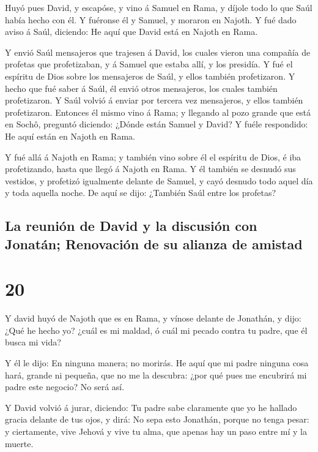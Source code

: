  Huyó pues David, y escapóse, y vino á Samuel en Rama, y
díjole todo lo que Saúl había hecho con él. Y fuéronse él y Samuel, y
moraron en Najoth.  Y fué dado aviso á Saúl, diciendo: He
aquí que David está en Najoth en Rama.

 Y envió Saúl mensajeros que trajesen á David, los cuales
vieron una compañía de profetas que profetizaban, y á Samuel que estaba
allí, y los presidía. Y fué el espíritu de Dios sobre los mensajeros de
Saúl, y ellos también profetizaron.  Y hecho que fué saber
á Saúl, él envió otros mensajeros, los cuales también profetizaron. Y
Saúl volvió á enviar por tercera vez mensajeros, y ellos también
profetizaron.  Entonces él mismo vino á Rama; y llegando al
pozo grande que está en Sochô, preguntó diciendo: ¿Dónde están Samuel y
David? Y fuéle respondido: He aquí están en Najoth en Rama.

 Y fué allá á Najoth en Rama; y también vino sobre él el
espíritu de Dios, é iba profetizando, hasta que llegó á Najoth en Rama.
 Y él también se desnudó sus vestidos, y profetizó
igualmente delante de Samuel, y cayó desnudo todo aquel día y toda
aquella noche. De aquí se dijo: ¿También Saúl entre los profetas?

\hypertarget{la-reuniuxf3n-de-david-y-la-discusiuxf3n-con-jonatuxe1n-renovaciuxf3n-de-su-alianza-de-amistad}{%
\subsection{La reunión de David y la discusión con Jonatán; Renovación
de su alianza de
amistad}\label{la-reuniuxf3n-de-david-y-la-discusiuxf3n-con-jonatuxe1n-renovaciuxf3n-de-su-alianza-de-amistad}}

\hypertarget{section-19}{%
\section{20}\label{section-19}}

 Y david huyó de Najoth que es en Rama, y vínose delante de
Jonathán, y dijo: ¿Qué he hecho yo? ¿cuál es mi maldad, ó cuál mi pecado
contra tu padre, que él busca mi vida?

 Y él le dijo: En ninguna manera; no morirás. He aquí que mi
padre ninguna cosa hará, grande ni pequeña, que no me la descubra: ¿por
qué pues me encubrirá mi padre este negocio? No será así.

 Y David volvió á jurar, diciendo: Tu padre sabe claramente
que yo he hallado gracia delante de tus ojos, y dirá: No sepa esto
Jonathán, porque no tenga pesar: y ciertamente, vive Jehová y vive tu
alma, que apenas hay un paso entre mí y la muerte.

